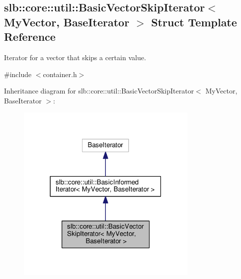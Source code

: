 \hypertarget{structslb_1_1core_1_1util_1_1BasicVectorSkipIterator}{}\subsection{slb\+:\+:core\+:\+:util\+:\+:Basic\+Vector\+Skip\+Iterator$<$ My\+Vector, Base\+Iterator $>$ Struct Template Reference}
\label{structslb_1_1core_1_1util_1_1BasicVectorSkipIterator}


Iterator for a vector that skips a certain value.  




{\ttfamily \#include $<$container.\+h$>$}



Inheritance diagram for slb\+:\+:core\+:\+:util\+:\+:Basic\+Vector\+Skip\+Iterator$<$ My\+Vector, Base\+Iterator $>$\+:\nopagebreak
\begin{figure}[H]
\begin{center}
\leavevmode
\includegraphics[width=247pt]{structslb_1_1core_1_1util_1_1BasicVectorSkipIterator__inherit__graph}
\end{center}
\end{figure}


